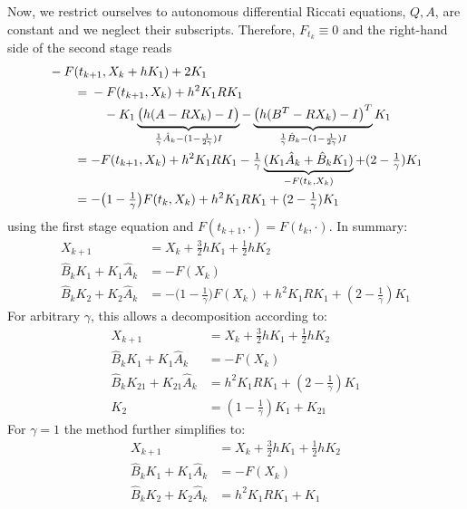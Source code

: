 Now, we restrict ourselves to autonomous differential Riccati equations,
\ie $Q, A$, \etc are constant and we neglect their subscripts.
Therefore, $F_{t_k}\equiv 0$ and the right-hand side of the second stage reads
\begin{subequations}\label{eq:mena:stage2:rhs:autonomous}
\begin{align}
  \MoveEqLeft
  -F(t_{k+1}, X_k + hK_1) + 2K_1
  \nonumber \\
  &= \begin{multlined}[t]
    -F(t_{k+1}, X_k) + h^2 K_1 R K_1 \\
    - K_1
    \underbrace{
      \big(h(A - R X_k) - I\big)
    }_{\frac{1}{\gamma} \hat{A}_k - (1-\frac{1}{2\gamma}) I}
    - \underbrace{
      \big(h(B^T - R X_k) - I\big)^T
    }_{\frac{1}{\gamma} \hat{B}_k - (1-\frac{1}{2\gamma}) I}
    K_1
  \end{multlined} \\
  &=
  -F(t_{k+1}, X_k) + h^2 K_1 R K_1
  -\tfrac{1}{\gamma}
  \underbrace{
    (K_1 \hat{A}_k + \hat{B}_k K_1)
  }_{-F(t_k,X_k)}
  + (2-\tfrac{1}{\gamma}) K_1 \\
  &= -\big(1-\tfrac{1}{\gamma}\big) F(t_k, X_k)
  + h^2 K_1 R K_1
  + (2-\tfrac{1}{\gamma}) K_1
\end{align}
\end{subequations}
using the first stage equation and $F(t_{k+1}, \cdot) = F(t_k,\cdot)$.
In summary:
\begin{subequations}
\begin{align}
  X_{k+1} &= X_k + \tfrac{3}{2} h K_1 + \tfrac{1}{2} h K_2 \\
  \hat{B}_k K_1 + K_1 \hat{A}_k &= -F(X_k) \\
  \hat{B}_k K_2 + K_2 \hat{A}_k &=
  -\big(1-\tfrac{1}{\gamma}\big) F(X_k)
  + h^2 K_1 R K_1
  + (2-\tfrac{1}{\gamma}) K_1
\end{align}
\end{subequations}
For arbitrary $\gamma$, this allows a decomposition according to:
\begin{subequations}\label{eq:mena:stages:autonomous}
\begin{align}
  \label{eq:mena:autonomous update}
  X_{k+1} &= X_k + \tfrac{3}{2} h K_1 + \tfrac{1}{2} h K_2 \\
  \hat{B}_k K_1 + K_1 \hat{A}_k &= -F(X_k) \\
  \label{eq:mena:autonomous K21}
  \hat{B}_k K_{21} + K_{21} \hat{A}_k &= h^2 K_1RK_1 + (2-\tfrac{1}{\gamma}) K_1 \\
  \label{eq:mena:autonomous K2}
  K_2 &= (1-\tfrac{1}{\gamma}) K_1 + K_{21}
\end{align}
\end{subequations}
For $\gamma=1$ the method further simplifies to:
\begin{subequations}\label{eq:mena:stages:gamma=1}
\begin{align}
  X_{k+1} &= X_k + \tfrac{3}{2} h K_1 + \tfrac{1}{2} h K_2 \\
  \hat{B}_k K_1 + K_1 \hat{A}_k &= -F(X_k) \\
  \hat{B}_k K_2 + K_2 \hat{A}_k &= h^2 K_1RK_1 + K_1
  \label{eq:mena:err:linear}
\end{align}
\end{subequations}

